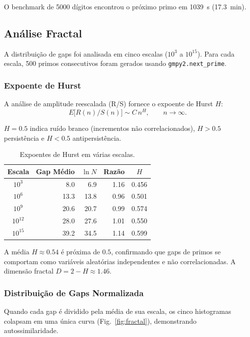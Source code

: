 \documentclass[12pt,a4paper]{article}
\theoremstyle{plain}
\begin{document}
O benchmark de 5000 dígitos encontrou o próximo primo em 1039~s (17.3~min).

\subsection{Análise Fractal}
\label{sec:fractal}

A distribuição de gaps foi analisada em cinco escalas ($10^3$ a
$10^{15}$).  Para cada escala, 500 primos consecutivos foram gerados
usando {\tt gmpy2.next\_prime}.

\subsubsection{Expoente de Hurst}

A análise de amplitude reescalada (R/S) fornece o expoente de Hurst $H$:
\[
E\bigl[R(n)/S(n)\bigr] \sim C\,n^H,\qquad n\to\infty.
\]

$H=0.5$ indica ruído branco (incrementos não correlacionados), $H>0.5$
persistência e $H<0.5$ antipersistência.

\begin{table}[htbp]
\centering
\caption{Expoentes de Hurst em várias escalas.}
\label{tab:hurst}
\begin{tabular}{crrrc}
\hline
Escala & Gap Médio & $\ln N$ & Razão & $H$ \\
\hline
$10^3$ & 8.0 & 6.9 & 1.16 & 0.456 \\
$10^6$ & 13.3 & 13.8 & 0.96 & 0.501 \\
$10^9$ & 20.6 & 20.7 & 0.99 & 0.574 \\
$10^{12}$ & 28.0 & 27.6 & 1.01 & 0.550 \\
$10^{15}$ & 39.2 & 34.5 & 1.14 & 0.599 \\
\hline
\end{tabular}
\end{table}

A média $H\approx0.54$ é próxima de $0.5$, confirmando que gaps de primos
se comportam como variáveis aleatórias independentes e não correlacionadas.  A dimensão
fractal $D=2-H\approx1.46$.

\subsubsection{Distribuição de Gaps Normalizada}

Quando cada gap é dividido pela média de sua escala, os cinco histogramas
colapsam em uma única curva (Fig.~\ref{fig:fractal}), demonstrando
autossimilaridade.
\end{document}
